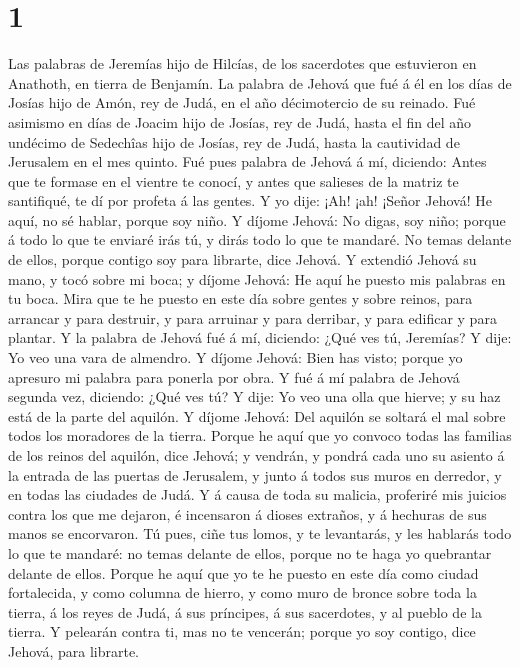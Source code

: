 \hypertarget{section}{%
\section{1}\label{section}}

 Las palabras de Jeremías hijo de Hilcías, de los
sacerdotes que estuvieron en Anathoth, en tierra de Benjamín.
 La palabra de Jehová que fué á él en los días de Josías
hijo de Amón, rey de Judá, en el año décimotercio de su reinado.
 Fué asimismo en días de Joacim hijo de Josías, rey de
Judá, hasta el fin del año undécimo de Sedechîas hijo de Josías, rey de
Judá, hasta la cautividad de Jerusalem en el mes quinto. 
Fué pues palabra de Jehová á mí, diciendo:  Antes que te
formase en el vientre te conocí, y antes que salieses de la matriz te
santifiqué, te dí por profeta á las gentes.  Y yo dije:
¡Ah! ¡ah! ¡Señor Jehová! He aquí, no sé hablar, porque soy niño.
 Y díjome Jehová: No digas, soy niño; porque á todo lo que
te enviaré irás tú, y dirás todo lo que te mandaré.  No
temas delante de ellos, porque contigo soy para librarte, dice Jehová.
 Y extendió Jehová su mano, y tocó sobre mi boca; y díjome
Jehová: He aquí he puesto mis palabras en tu boca.  Mira
que te he puesto en este día sobre gentes y sobre reinos, para arrancar
y para destruir, y para arruinar y para derribar, y para edificar y para
plantar.  Y la palabra de Jehová fué á mí, diciendo: ¿Qué
ves tú, Jeremías? Y dije: Yo veo una vara de almendro.  Y
díjome Jehová: Bien has visto; porque yo apresuro mi palabra para
ponerla por obra.  Y fué á mí palabra de Jehová segunda
vez, diciendo: ¿Qué ves tú? Y dije: Yo veo una olla que hierve; y su haz
está de la parte del aquilón.  Y díjome Jehová: Del
aquilón se soltará el mal sobre todos los moradores de la tierra.
 Porque he aquí que yo convoco todas las familias de los
reinos del aquilón, dice Jehová; y vendrán, y pondrá cada uno su asiento
á la entrada de las puertas de Jerusalem, y junto á todos sus muros en
derredor, y en todas las ciudades de Judá.  Y á causa de
toda su malicia, proferiré mis juicios contra los que me dejaron, é
incensaron á dioses extraños, y á hechuras de sus manos se encorvaron.
 Tú pues, ciñe tus lomos, y te levantarás, y les hablarás
todo lo que te mandaré: no temas delante de ellos, porque no te haga yo
quebrantar delante de ellos.  Porque he aquí que yo te he
puesto en este día como ciudad fortalecida, y como columna de hierro, y
como muro de bronce sobre toda la tierra, á los reyes de Judá, á sus
príncipes, á sus sacerdotes, y al pueblo de la tierra.  Y
pelearán contra ti, mas no te vencerán; porque yo soy contigo, dice
Jehová, para librarte.

